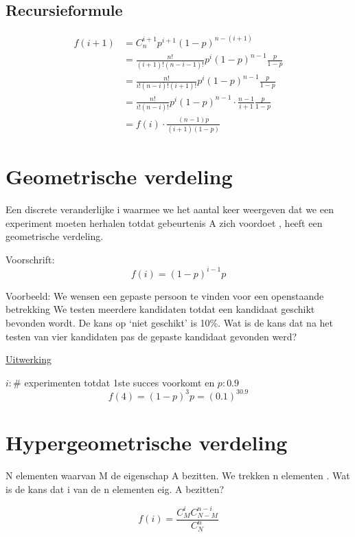 \documentclass[12pt]{report}
\newcommand{\example}[2]{
      \hrulefill
      
      Voorbeeld: #1
      
      \underline{Uitwerking}
      
      #2
      
      \hrulefill
  }
\begin{document}
\subsection{Recursieformule}
\begin{equation*}
 \begin{split}
  f(i + 1) & = C_n^{i + 1}p^{i + 1}(1 - p)^{n- (i + 1)} \\
           & = \frac{n!}{(i + 1)!(n - i - 1)!}p^i(1 -p)^{n - 1} \frac{p}{1 - p} \\
           & = \frac{n!}{i!(n - i)!(i + 1)!}p^i(1 -p)^{n - 1} \frac{p}{1 - p} \\
           & = \frac{n!}{i!(n - i)!}p^i(1 -p)^{n - 1} \cdot \frac{n - 1}{i + 1}\frac{p}{1 - p} \\
           & = f(i) \cdot \frac{(n - 1)p}{(i + 1)(1 - p)}
 \end{split}
\end{equation*}


\section{Geometrische verdeling}
Een discrete veranderlijke 
i
waarmee we het 
aantal keer
weergeven dat  we een experiment 
moeten herhalen 
totdat gebeurtenis A zich 
voordoet
, heeft een 
geometrische verdeling.

Voorschrift:
$$f(i) = (1 - p)^{i - 1}p$$
\example{
    We wensen een gepaste persoon te vinden voor een 
    openstaande betrekking
    We testen meerdere kandidaten totdat een kandidaat 
    geschikt bevonden wordt.
    De kans op ‘niet geschikt’ is 10\%.
    Wat is de kans dat na het testen van vier kandidaten pas 
    de gepaste kandidaat gevonden werd?
}{
    $i : \#$ experimenten totdat 1ste succes voorkomt en $p: 0.9$
    $$f(4) = (1 - p)^3p = (0.1)^30.9$$
}

\section{Hypergeometrische verdeling}
N elementen waarvan M de eigenschap A bezitten.
We trekken n elementen .
Wat is de kans dat i van de n elementen eig. A bezitten?

$$f(i) = \frac{C_M^iC_{N - M}^{n - i}}{C_N^n}$$
\end{document}
